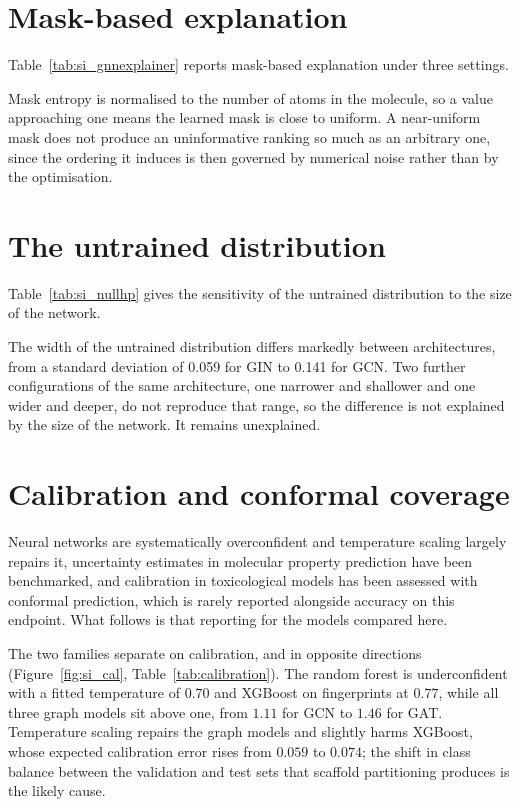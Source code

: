 \documentclass[journal=jcisd8,manuscript=suppinfo]{achemso}
\begin{document}
\section{Mask-based explanation}

Table~\ref{tab:si_gnnexplainer} reports mask-based explanation under three settings.



Mask entropy is normalised to the number of atoms in the molecule, so a value approaching one
means the learned mask is close to uniform. A near-uniform mask does not produce an
uninformative ranking so much as an arbitrary one, since the ordering it induces is then
governed by numerical noise rather than by the optimisation.

\section{The untrained distribution}

Table~\ref{tab:si_nullhp} gives the sensitivity of the untrained distribution to the size of
the network.



The width of the untrained distribution differs markedly between architectures, from a
standard deviation of 0.059 for GIN to 0.141 for GCN. Two further configurations of the same
architecture, one narrower and shallower and one wider and deeper, do not reproduce that
range, so the difference is not explained by the size of the network. It remains unexplained.

\section{Calibration and conformal coverage}

Neural networks are systematically overconfident and temperature scaling largely repairs
it,\cite{guo2017calibration} uncertainty estimates in molecular property prediction have been
benchmarked,\cite{scalia2020uncertainty} and calibration in toxicological models has been
assessed with conformal prediction,\cite{bosc2021conformal,vovk2005} which is rarely reported
alongside accuracy on this endpoint. What follows is that reporting for the models compared
here.

The two families separate on calibration, and in opposite directions
(Figure~\ref{fig:si_cal}, Table~\ref{tab:calibration}). The random forest is
underconfident with a fitted temperature of $0.70$ and XGBoost on fingerprints at $0.77$,
while all three graph models sit above one, from $1.11$ for GCN to $1.46$ for GAT.
Temperature scaling repairs the graph models and slightly harms XGBoost, whose expected
calibration error rises from $0.059$ to $0.074$; the shift in class balance between the
validation and test sets that scaffold partitioning produces is the likely cause.
\end{document}
